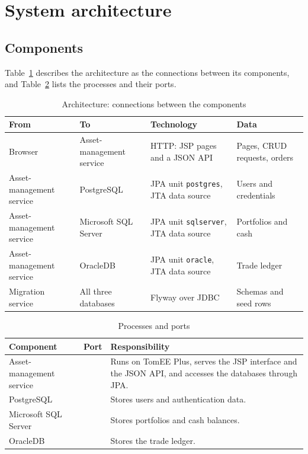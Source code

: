 \documentclass[12pt,a4paper]{article}
\newcommand{\code}[1]{\texttt{\small #1}}
\begin{document}
\section{System architecture}

\subsection{Components}

Table~\ref{tab:flows} describes the architecture as the connections between
its components, and Table~\ref{tab:components} lists the processes and their
ports.

\begin{table}[htbp]
\centering
\small
\begin{tabularx}{\textwidth}{>{\raggedright\arraybackslash}p{2.9cm}
                             >{\raggedright\arraybackslash}p{2.9cm}
                             >{\raggedright\arraybackslash}X
                             >{\raggedright\arraybackslash}p{3.1cm}}
\toprule
\textbf{From} & \textbf{To} & \textbf{Technology} & \textbf{Data}\\
\midrule
Browser & Asset-management service & HTTP: JSP pages and a JSON API & Pages,
CRUD requests, orders\\
Asset-management service & PostgreSQL & JPA unit \code{postgres}, JTA data
source & Users and credentials\\
Asset-management service & Microsoft SQL Server & JPA unit
\code{sqlserver}, JTA data source & Portfolios and cash\\
Asset-management service & OracleDB & JPA unit \code{oracle}, JTA data
source & Trade ledger\\
Migration service & All three databases & Flyway over JDBC & Schemas and
seed rows\\
\bottomrule
\end{tabularx}
\caption{Architecture: connections between the components}
\label{tab:flows}
\end{table}

\begin{table}[htbp]
\centering
\begin{tabular}{>{\raggedright\arraybackslash}p{3.3cm}
                >{\centering\arraybackslash}p{1.5cm}
                >{\raggedright\arraybackslash}p{7.0cm}}
\toprule
\textbf{Component} & \textbf{Port} & \textbf{Responsibility}\\
\midrule
Asset-management service & 8081 & Runs on TomEE Plus, serves the JSP
interface and the JSON API, and accesses the databases through JPA.\\
PostgreSQL & 5432 & Stores users and authentication data.\\
Microsoft SQL Server & 1433 & Stores portfolios and cash balances.\\
OracleDB & 1521 & Stores the trade ledger.\\
\bottomrule
\end{tabular}
\caption{Processes and ports}
\label{tab:components}
\end{table}
\end{document}
